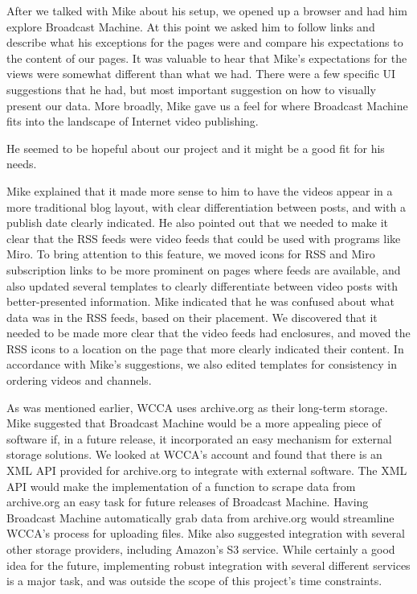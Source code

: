 \documentclass[a4paper,12pt]{report}
\begin{document}
After we talked with Mike about his setup, we opened up a browser and had him explore Broadcast Machine. At this point we 
asked him to follow links and describe what his exceptions for the pages were and compare his expectations to the 
content of our pages. 
It was valuable to hear that Mike's expectations for the views were somewhat different than what we had. 
There were a few specific UI suggestions that he had, but most important suggestion on how to visually present our data.
More broadly, Mike gave us a feel for where Broadcast Machine fits into the landscape of Internet video publishing. 

He seemed to be hopeful about our project and it might be a good fit for his needs.

Mike explained that it made more sense to him to have the videos appear in a more traditional blog layout, with clear 
differentiation between posts, and with a publish date clearly indicated. 
He also pointed out that we needed to make it clear that the RSS feeds were video feeds that could be used with 
programs like Miro. To bring attention to this feature, we moved icons for RSS and Miro subscription links to be more prominent on pages where feeds are available, and also updated several templates to clearly differentiate between video posts with better-presented information. Mike indicated that he was confused about what data was in the RSS feeds, based on their placement. We discovered that it needed to be made more clear that the video feeds had enclosures, and moved the RSS icons to a location on the page that more clearly indicated their content. In accordance with Mike's suggestions, we also edited templates for consistency in ordering videos and channels.

As was mentioned earlier, WCCA uses archive.org as their long-term storage. 
Mike suggested that Broadcast Machine would be a more appealing piece of software if, in a future release, it 
incorporated an easy mechanism for external storage solutions. 
We looked at WCCA's account and found that there is an XML API provided for archive.org to integrate with external 
software. The XML API would make the implementation of a function to scrape data from archive.org an easy task for future releases of Broadcast Machine. Having Broadcast Machine automatically grab data from archive.org would streamline WCCA's process for uploading files. Mike also suggested integration with several other storage providers, including Amazon's S3 service. While certainly a good idea for the future, implementing robust integration with several different services is a major task, and was outside the scope of this project's time constraints.
\end{document}
